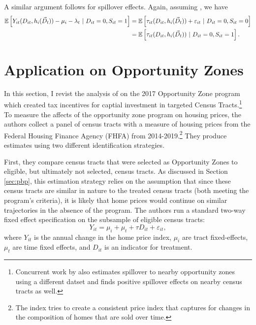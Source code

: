 \documentclass[11pt]{article}
\begin{document}
A similar argument follows for spillover effects. Again, assuming , we have 
\begin{align*}
  \mathbb{E}\left[Y_{it}(D_{it}, h_i(\vec{D}_t)) - \mu_i - \lambda_t \ | \ D_{it} = 0, S_{it} = 1\right] 
  &= \mathbb{E}\left[\tau_{it}(D_{it}, h_i(\vec{D}_t)) + \varepsilon_{it} \ | \ D_{it} = 0, S_{it} = 0\right] \\
  &= \mathbb{E}\left[\tau_{it}(D_{it}, h_i(\vec{D}_t)) \ | \ D_{it} = 0, S_{it} = 1\right].
\end{align*}


\section{Application on Opportunity Zones}\label{sec:oz}

In this section, I revist the analysis of \citet{Chen_Glaeser_Wessel_2021} on the 2017 Opportunity Zone program which created tax incentives for captial investment in targeted Census Tracts.\footnote{Concurrent work by \citet{Arefeva_2021} also estimates spillover to nearby opportunity zones using a different datset and finds positive spillover effects on nearby census tracts as well.} To measure the affects of the opportunity zone program on housing prices, the authors collect a panel of census tracts with a measure of housing prices from the Federal Housing Finance Agency (FHFA) from 2014-2019.\footnote{The index tries to create a consistent price index that captures for changes in the composition of homes that are sold over time.} They produce estimates using two different identification strategies.

First, they compare census tracts that were selected as Opportunity Zones to eligible, but ultimately not selected, census tracts. As discussed in Section \ref{sec:pbp}, this estimation strategy relies on the assumption that since these census tracts are similar in nature to the treated census tracts (both meeting the program's criteria), it is likely that home prices would continue on similar trajectories in the absence of the program. The authors run a standard two-way fixed effect specification on the subsample of eligible census tracts:
\begin{equation}\label{eq:oz-eligible}
    Y_{it} = \mu_i + \mu_t + \tau D_{it} + \varepsilon_{it},
\end{equation}
where $Y_{it}$ is the annual change in the home price index, $\mu_i$ are tract fixed-effects, $\mu_t$ are time fixed effects, and $D_{it}$ is an indicator for treatment. 
\end{document}
